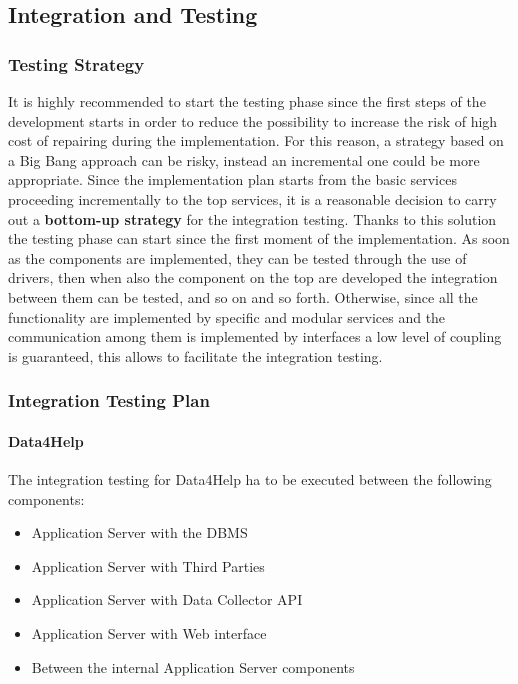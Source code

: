 \documentclass[a4paper]{article}
\begin{document}
\subsection{Integration and Testing}

\subsubsection{Testing Strategy}
It is highly recommended to start the testing phase since the first steps of the development starts in order to reduce the possibility to increase the risk of high cost of repairing during the implementation. For this reason, a strategy based on a Big Bang approach can be risky, instead an incremental one could be more appropriate.
Since the implementation plan starts from the basic services proceeding incrementally to the top services, it is a reasonable decision to carry out a \textbf{bottom-up strategy} for the integration testing.
Thanks to this solution the testing phase can start since the first moment of the implementation. As soon as the components are implemented, they can be tested through the use of drivers, then when also the component on the top are developed the integration between them can be tested, and so on and so forth.
Otherwise, since all the functionality are implemented by specific and modular services and the communication among them is implemented by interfaces a low level of coupling is guaranteed, this allows to facilitate the integration testing.

\subsubsection{Integration Testing Plan}

\paragraph{Data4Help}
The integration testing for Data4Help ha to be executed between the following components:

\begin{itemize}
    \item Application Server with the DBMS
    \item Application Server with Third Parties
    \item Application Server with Data Collector API
    \item Application Server with Web interface
    \item Between the internal Application Server components
\end{itemize}
\end{document}
